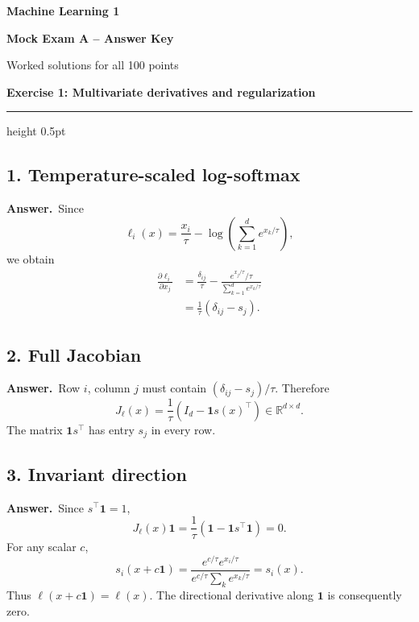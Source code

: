 \documentclass[11pt,a4paper]{article}
\newcommand{\exercise}[2]{%
  \Needspace{8\baselineskip}%
  \par\addvspace{1.1em}%
  {\Large\bfseries\color{examblue}Exercise #1: #2\par}%
  \nobreak\vspace{0.2em}%
  {\color{rulegray}\hrule height 0.5pt}%
  \vspace{0.55em}%
}
\newcommand{\answer}{\textbf{Answer.}\ }
\begin{document}
\begin{center}
  {\Huge\bfseries\color{examblue} Machine Learning 1}\par
  \vspace{0.35em}
  {\LARGE\bfseries Mock Exam A -- Answer Key}\par
  \vspace{0.7em}
  {\large Worked solutions for all 100 points}
\end{center}

\vspace{0.8em}

\exercise{1}{Multivariate derivatives and regularization}

\subsection*{1. Temperature-scaled log-softmax}

\answer Since
\[
  \ell_i(x)=\frac{x_i}{\tau}
  -\log\left(\sum_{k=1}^{d}e^{x_k/\tau}\right),
\]
we obtain
\begin{align*}
  \frac{\partial\ell_i}{\partial x_j}
  &=\frac{\delta_{ij}}{\tau}
    -\frac{e^{x_j/\tau}/\tau}{\sum_{k=1}^{d}e^{x_k/\tau}}\\
  &=\frac{1}{\tau}(\delta_{ij}-s_j).
\end{align*}

\subsection*{2. Full Jacobian}

\answer Row $i$, column $j$ must contain $(\delta_{ij}-s_j)/\tau$. Therefore
\[
  \boxed{J_{\ell}(x)=\frac{1}{\tau}
  \left(I_d-\mathbf{1}s(x)^\top\right)}
  \in\mathbb{R}^{d\times d}.
\]
The matrix $\mathbf{1}s^\top$ has entry $s_j$ in every row.

\subsection*{3. Invariant direction}

\answer Since $s^\top\mathbf{1}=1$,
\[
  J_{\ell}(x)\mathbf{1}
  =\frac{1}{\tau}\left(\mathbf{1}
  -\mathbf{1}s^\top\mathbf{1}\right)=0.
\]
For any scalar $c$,
\[
  s_i(x+c\mathbf{1})
  =\frac{e^{c/\tau}e^{x_i/\tau}}
  {e^{c/\tau}\sum_k e^{x_k/\tau}}
  =s_i(x).
\]
Thus $\ell(x+c\mathbf{1})=\ell(x)$. The directional derivative along $\mathbf{1}$ is consequently zero.
\end{document}
